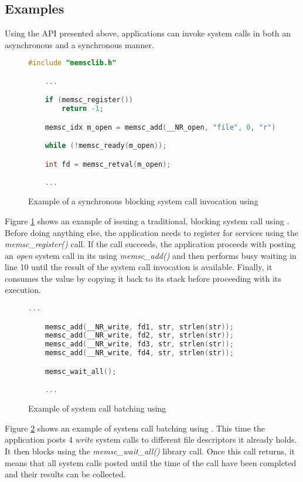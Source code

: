 \subsection{Examples}

Using the \lib API presented above, applications can invoke system calls in
both an asynchronous and a synchronous manner.

\begin{figure}[h]
    \begin{lstlisting}[language=C, breaklines=false]
#include "memsclib.h"

	...

	if (memsc_register())
		return -1;

	memsc_idx m_open = memsc_add(__NR_open, "file", 0, "r");

	while (!memsc_ready(m_open));

	int fd = memsc_retval(m_open);

	...
    \end{lstlisting}
    \caption{Example of a synchronous blocking system call invocation using
    \memsc}
    \label{fig:example_sync}
\end{figure}

Figure \ref{fig:example_sync} shows an example of issuing a traditional,
blocking system call using \lib. Before doing anything else, the application
needs to register for \memsc services using the \emph{memsc\_register()} call.
If the call succeeds, the application proceeds with posting an \emph{open}
system call in its \sysp using \emph{memsc\_add()} and then performs busy
waiting in line 10 until the result of the system call invocation is available.
Finally, it consumes the value by copying it back to its stack before
proceeding with its execution.

\begin{figure}[h]
    \begin{lstlisting}[language=C]
	...

	memsc_add(__NR_write, fd1, str, strlen(str));
	memsc_add(__NR_write, fd2, str, strlen(str));
	memsc_add(__NR_write, fd3, str, strlen(str));
	memsc_add(__NR_write, fd4, str, strlen(str));

	memsc_wait_all();

	...
    \end{lstlisting}
    \caption{Example of system call batching using \memsc}
    \label{fig:example_batch}
\end{figure}

Figure \ref{fig:example_batch} shows an example of system call batching using
\lib. This time the application posts 4 \emph{write} system calls to different
file descriptors it already holds. It then blocks using the
\emph{memsc\_wait\_all()} library call. Once this call returns, it means that
all system calls posted until the time of the call have been completed and
their results can be collected.

